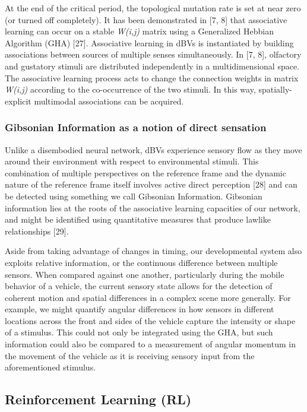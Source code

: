 \documentclass{article}
\begin{document}
At the end of the critical period, the topological mutation rate is set at near zero (or turned off completely). It has been demonstrated in [7, 8] that associative learning can occur on a stable {\it W(i,j)} matrix using a Generalized Hebbian Algorithm (GHA) [27]. Associative learning in dBVs is instantiated by building associations between sources of multiple senses simultaneously. In [7, 8], olfactory and gustatory stimuli are distributed independently in a multidimensional space. The associative learning process acts to change the connection weights in matrix {\it W(i,j)} according to the co-occurrence of the two stimuli. In this way, spatially-explicit multimodal associations can be acquired. 
\subsubsection*{Gibsonian Information as a notion of direct sensation}

Unlike a disembodied neural network, dBVs experience sensory flow as they move around their environment with respect to environmental stimuli. This combination of multiple perspectives on the reference frame and the dynamic nature of the reference frame itself involves active direct perception [28] and can be detected using something we call Gibsonian Information. Gibsonian information lies at the roots of the associative learning capacities of our network, and might be identified using quantitative measures that produce lawlike relationships [29]. 

Aside from taking advantage of changes in timing, our developmental system also exploits relative information, or the continuous difference between multiple sensors. When compared against one another, particularly during the mobile behavior of a vehicle, the current sensory state allows for the detection of coherent motion and spatial differences in a complex scene more generally. For example, we might quantify angular differences in how sensors in different locations across the front and sides of the vehicle capture the intensity or shape of a stimulus. This could not only be integrated using the GHA, but such information could also be compared to a measurement of angular momentum in the movement of the vehicle as it is receiving sensory input from the aforementioned stimulus.

\subsection*{Reinforcement Learning (RL)}
\end{document}
